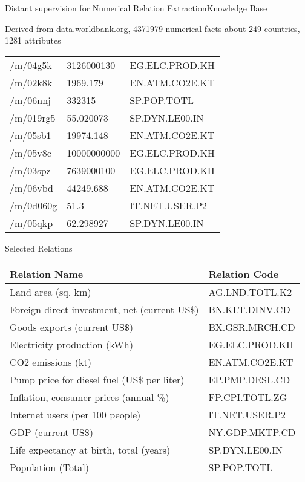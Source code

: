 \documentclass{beamer}
\begin{document}
\let\tempone\itemize
\let\temptwo\enditemize
\renewenvironment{itemize}{\tempone\addtolength{\itemsep}{0.5\baselineskip}}{\temptwo}

\begin{frame}{Distant supervision for Numerical Relation Extraction}{Knowledge Base}
 \begin{itemize}
  \item Derived from \url{data.worldbank.org}, 4371979 numerical facts about 249 countries, 1281 attributes 

\begin{tabular}{|l|l|l|}
\hline
/m/04g5k&3126000130&EG.ELC.PROD.KH\\
/m/02k8k&1969.179&EN.ATM.CO2E.KT\\
/m/06nnj&332315&SP.POP.TOTL\\
/m/019rg5&55.020073&SP.DYN.LE00.IN\\
/m/05sb1&19974.148&EN.ATM.CO2E.KT\\
/m/05v8c&10000000000&EG.ELC.PROD.KH\\
/m/03spz&7639000100&EG.ELC.PROD.KH\\
/m/06vbd&44249.688&EN.ATM.CO2E.KT\\
/m/0d060g&51.3&IT.NET.USER.P2\\
/m/05qkp&62.298927&SP.DYN.LE00.IN\\
\hline
\end{tabular}


\end{itemize}

\end{frame}

\begin{frame}{Selected Relations}
 \begin{center}
\begin{tabular}{|l|l|}
\hline
Relation Name & Relation Code \\
\hline
Land area (sq. km)&AG.LND.TOTL.K2\\
Foreign direct investment, net (current US\$)&BN.KLT.DINV.CD\\
Goods exports (current US\$)&BX.GSR.MRCH.CD\\
Electricity production (kWh)&EG.ELC.PROD.KH\\
CO2 emissions (kt)&EN.ATM.CO2E.KT\\
Pump price for diesel fuel (US\$ per liter)&EP.PMP.DESL.CD\\
Inflation, consumer prices (annual \%)&FP.CPI.TOTL.ZG\\
Internet users (per 100 people)&IT.NET.USER.P2\\
GDP (current US\$)&NY.GDP.MKTP.CD\\
Life expectancy at birth, total (years)&SP.DYN.LE00.IN\\
Population (Total)&SP.POP.TOTL\\
\hline
\end{tabular}
\end{center}

\end{frame}
\end{document}
